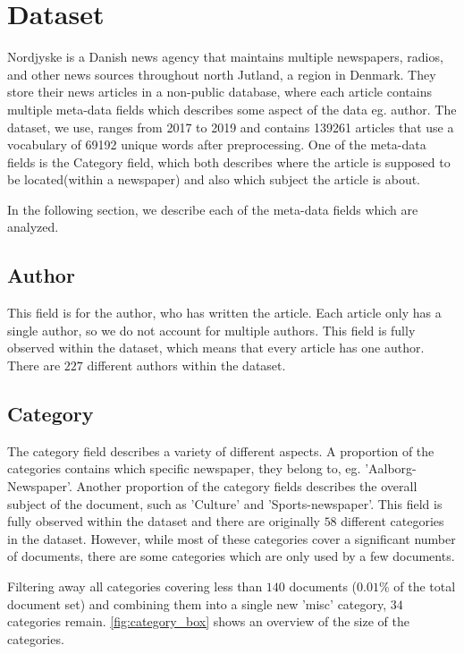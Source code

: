 \section{Dataset}
Nordjyske is a Danish news agency that maintains multiple newspapers, radios, and other news sources throughout north Jutland, a region in Denmark.
They store their news articles in a non-public database, where each article contains multiple meta-data fields which describes some aspect of the data eg. author.
The dataset, we use, ranges from 2017 to 2019 and contains 139261 articles that use a vocabulary of 69192 unique words after preprocessing.
One of the meta-data fields is the Category field, which both describes where the article is supposed to be located(within a newspaper) and also which subject the article is about.

In the following section, we describe each of the meta-data fields which are analyzed.

\subsection{Author}
This field is for the author, who has written the article.
Each article only has a single author, so we do not account for multiple authors.
This field is fully observed within the dataset, which means that every article has one author.
There are $227$ different authors within the dataset.

\subsection{Category}
The category field describes a variety of different aspects.
A proportion of the categories contains which specific newspaper, they belong to, eg. 'Aalborg-Newspaper'.
Another proportion of the category fields describes the overall subject of the document, such as 'Culture' and 'Sports-newspaper'.
This field is fully observed within the dataset and there are originally $58$ different categories in the dataset.
However, while most of these categories cover a significant number of documents, there are some categories which are only used by a few documents.

Filtering away all categories covering less than $140$ documents ($0.01\%$ of the total document set) and combining them into a single new 'misc' category, $34$ categories remain.
\autoref{fig:category_box} shows an overview of the size of the categories.

